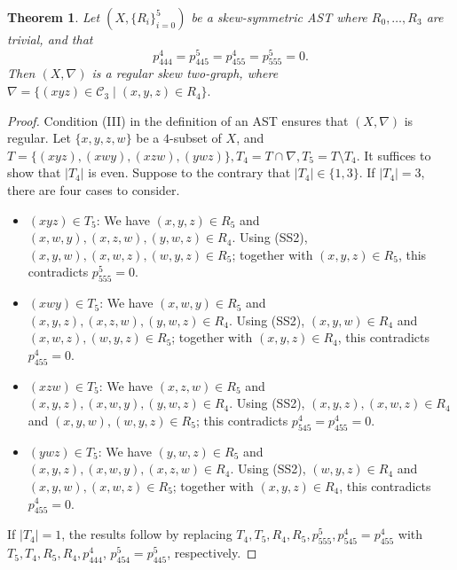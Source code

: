 \documentclass[11pt,oneside]{amsart}
\newtheorem{theorem}{Theorem}[section]
\begin{document}
{\begin{theorem}
    Let $(X,\{R_i\}_{i=0}^5)$ be a skew-symmetric AST where $R_0,\ldots,R_3$ are trivial, and that\[p_{444}^4=p_{445}^5=p_{455}^4=p_{555}^5=0.\] 
    Then $(X,\nabla)$ is a regular skew two-graph, where $\nabla=\{(xyz)\in \mathcal C_3\mid (x,y,z) \in R_4\}.$  
\end{theorem}
\begin{proof}
Condition (III) in the definition of an AST ensures that $(X,\nabla)$ is regular. Let $\{x,y,z,w\}$ be a $4$-subset of $X$, and  $T=\{(xyz),(xwy),(xzw),(ywz)\}, T_4=T\cap \nabla, T_5=T\setminus T_4$. It suffices to show that $|T_4|$ is even.   
Suppose to the contrary that $|T_4|\in\{1,3\}$. If $|T_4|=3$, there are four cases to consider.
\begin{itemize}
    \item $(xyz)\in T_5$: We have  $(x,y,z)\in R_5$ and $(x,w,y),(x,z,w),(y,w,z)\in R_4$. Using (SS2), $(x,y,w),(x,w,z),(w,y,z)\in R_5$; together with $(x,y,z)\in R_5$, this contradicts $p_{555}^5=0$.
    \item $(xwy)\in T_5$: We have $(x,w,y)\in R_5$ and $(x,y,z),(x,z,w),(y,w,z)\in R_4$. Using (SS2), $(x,y,w)\in R_4$ and $(x,w,z),(w,y,z)\in R_5$;
    together with $(x,y,z)\in R_4$, this contradicts $p_{455}^4=0$. 
    \item $(xzw)\in T_5$: We have $(x,z,w)\in R_5$ and $(x,y,z),(x,w,y),(y,w,z)\in R_4$. Using (SS2), $(x,y,z),(x,w,z)\in R_4$ and $(x,y,w),(w,y,z)\in R_5$;
     this contradicts $p_{545}^4=p_{455}^{4}=0$. 
    \item $(ywz)\in T_5$: We have $(y,w,z)\in R_5$ and $(x,y,z),(x,w,y),(x,z,w)\in R_4$. Using (SS2), $(w,y,z)\in R_4$ and $(x,y,w),(x,w,z)\in R_5$; 
    together with $(x,y,z)\in R_4$, this contradicts $p_{455}^{4}=0$. 
\end{itemize}
If $|T_4|=1$, the results follow by replacing $T_4, T_5, R_4,R_5,p_{555}^5,p_{545}^4=p_{455}^4$ with $T_5, T_4, R_5,R_4,p_{444}^4$, $p_{454}^5=p_{445}^5$, respectively.
\end{proof}


}
\end{document}
